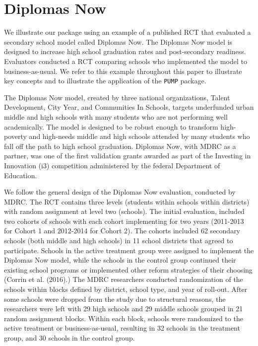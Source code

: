 \documentclass[
]{article}
\begin{document}
\section{Diplomas Now}
\label{sec:diplomas}

We illustrate our package using an example of a published RCT that
evaluated a secondary school model called Diplomas Now. The Diplomas Now
model is designed to increase high school graduation rates and
post-secondary readiness. Evaluators conducted a RCT comparing schools
who implemented the model to business-as-usual. We refer to this example
throughout this paper to illustrate key concepts and to illustrate the
application of the \texttt{PUMP} package.

The Diplomas Now model, created by three national organizations, Talent
Development, City Year, and Communities In Schools, targets underfunded
urban middle and high schools with many students who are not performing
well academically. The model is designed to be robust enough to
transform high-poverty and high-needs middle and high schools attended
by many students who fall off the path to high school graduation.
Diplomas Now, with MDRC as a partner, was one of the first validation
grants awarded as part of the Investing in Innovation (i3) competition
administered by the federal Department of Education.

We follow the general design of the Diplomas Now evaluation, conducted
by MDRC. The RCT contains three levels (students within schools within
districts) with random assignment at level two (schools). The initial
evaluation, included two cohorts of schools with each cohort
implementing for two years (2011-2013 for Cohort 1 and 2012-2014 for
Cohort 2). The cohorts included 62 secondary schools (both middle and
high schools) in 11 school districts that agreed to participate. Schools
in the active treatment group were assigned to implement the Diplomas
Now model, while the schools in the control group continued their
existing school programs or implemented other reform strategies of their
choosing (Corrin et al. (2016).) The MDRC researchers conducted
randomization of the schools within blocks defined by district, school
type, and year of roll-out. After some schools were dropped from the
study due to structural reasons, the researchers were left with 29 high
schools and 29 middle schools grouped in 21 random assignment blocks.
Within each block, schools were randomized to the active treatment or
business-as-usual, resulting in 32 schools in the treatment group, and
30 schools in the control group.
\end{document}

